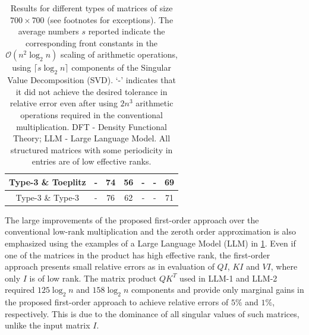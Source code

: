 \documentclass[onefignum,onetabnum]{siamart171218}
\begin{document}
\begin{table}[H]
\begin{tabular}{|c|c|c|c|c|c|c|}
         Type-3 \& Toeplitz&-  &74 & 56&-  &- & 69 \\
         \hline
         Type-3 \& Type-3\footnotemark[4]& - &76 & 62& - & -&71  \\
         \hline
         
    \end{tabular}
    \caption{Results for different types of matrices of size $700 \times 700$ (see footnotes for exceptions). The average numbers $s$ reported indicate the corresponding front constants in the $\mathcal{O}(n^2 \log_2 n)$ scaling of arithmetic operations, using $\lceil s \log_2 n \rceil$ components of the Singular Value Decomposition (SVD). `-' indicates that it did not achieve the desired tolerance in relative error even after using $2n^3$ arithmetic operations required in the conventional multiplication. DFT - Density Functional Theory; LLM - Large Language Model. All structured matrices with some periodicity in entries are of low effective ranks.}
    \label{tab:svd1}
\end{table}

The large improvements of the proposed first-order approach over the conventional low-rank multiplication and the zeroth order approximation is also emphasized using the examples of a Large Language Model (LLM) in \cref{tab:svd1}. Even if one of the matrices in the product has high effective rank, the first-order approach presents small relative errors as in evaluation of $QI$, $KI$ and $VI$, where only $I$ is of low rank. The matrix product $QK^T$ used in LLM-1 and LLM-2 required $125\log_2 n$ and $158\log_2 n$ components and provide only marginal gains in the proposed first-order approach to achieve relative errors of $5\%$ and $1\%$, respectively. This is due to the dominance of all singular values of such matrices, unlike the input matrix $I$.
\end{document}
